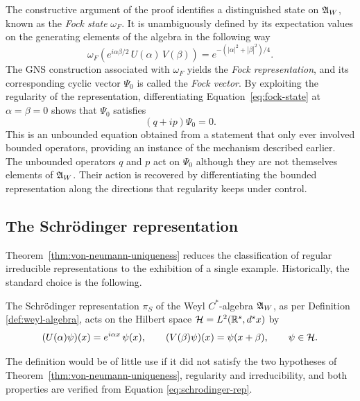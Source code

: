 	\begin{remark}
		The constructive argument of the proof identifies a distinguished state on $\mathfrak{A}_W$, known as the \emph{Fock state} $\omega_F$. It is unambiguously defined by its expectation values on the generating elements of the algebra in the following way
		\begin{equation}
			\omega_F\left(e^{i\alpha\beta/2}\,U(\alpha)\,V(\beta)\right) = e^{-(|\alpha|^2+|\beta|^2)/4}.
			\label{eq:fock-state}
		\end{equation}
		The GNS construction associated with $\omega_F$ yields the \emph{Fock representation}, and its corresponding cyclic vector $\Psi_0$ is called the \emph{Fock vector}. By exploiting the regularity of the representation, differentiating Equation~\eqref{eq:fock-state} at $\alpha=\beta=0$ shows that $\Psi_0$ satisfies $$(q+ip)\Psi_0=0.$$ This is an unbounded equation obtained from a statement that only ever involved bounded operators, providing an instance of the mechanism described earlier. The unbounded operators $q$ and $p$ act on $\Psi_0$ although they are not themselves elements of $\mathfrak{A}_W$. Their action is recovered by differentiating the bounded representation along the directions that regularity keeps under control.
	\end{remark}
	
	\subsection*{The Schr\"odinger representation}
	
	Theorem~\ref{thm:von-neumann-uniqueness} reduces the classification of regular irreducible representations to the exhibition of a single example. Historically, the standard choice is the following.
	
	\begin{definition}
		\label{def:schrodinger-representation}
		The Schr\"odinger representation $\pi_S$ of the Weyl $C^*$-algebra $\mathfrak{A}_W$, as per Definition \ref{def:weyl-algebra}, acts on the Hilbert space $\H = L^2(\mathbb{R}^s,d^sx)$ by
		\begin{equation}
			(U(\alpha)\psi)(x) = e^{i\alpha x}\,\psi(x), \qquad (V(\beta)\psi)(x) = \psi(x+\beta), \qquad \psi \in \H.
			\label{eq:schrodinger-rep}
		\end{equation}
	\end{definition}
	
	\noindent The definition would be of little use if it did not satisfy the two hypotheses of Theorem~\ref{thm:von-neumann-uniqueness}, regularity and irreducibility, and both properties are verified from Equation \eqref{eq:schrodinger-rep}.
	

